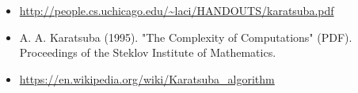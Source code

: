 \documentclass{article}
\begin{document}
\begin{itemize}\itemsep .125cm
	\item \url{http://people.cs.uchicago.edu/~laci/HANDOUTS/karatsuba.pdf}
	\item A. A. Karatsuba (1995). "The Complexity of Computations" (PDF). Proceedings of the Steklov Institute of Mathematics. 
	\item \url{https://en.wikipedia.org/wiki/Karatsuba_algorithm}
\end{itemize}

\ifx\onefile\undefined
	
\end{document}
